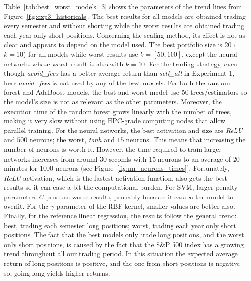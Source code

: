 Table~\ref{tab:best_worst_models_3} shows the parameters of the trend lines from Figure~\ref{fig:exp3_historicals}. The best results for all models are obtained trading every semester and without shorting while the worst results are obtained trading each year only short positions. Concerning the scaling method, its effect is not as clear and appears to depend on the model used. The best portfolio size is 20 ($k=10$) for all models while worst results use $k=[50, 100]$, except the neural networks whose worst result is also with $k=10$. For the trading strategy, even though \textit{avoid\_fees} has a better average return than \textit{sell\_all} in Experiment 1, here \textit{avoid\_fees} is not used by any of the best models.
For both the random forest and AdaBoost models, the best and worst model use 50 trees/estimators so the model's size is not as relevant as the other parameters. Moreover, the execution time of the random forest grows linearly with the number of trees, making it very slow without using HPC-grade computing nodes that allow parallel training.
For the neural networks, the best activation and size are \textit{ReLU} and $500$ neurons; the worst, \textit{tanh} and $15$ neurons. This means that increasing the number of neurons is worth it. However, the time required to train larger networks increases from  around 30 seconds with 15 neurons to an average of 20 minutes for 1000 neurons (see Figure~\ref{fig:nn_neurons_times}). Fortunately, \textit{ReLU} activation, which is the fastest activation function, also gets the best results so it can ease a bit the computational burden.
For SVM, larger penalty parameters $C$ produce worse results, probably because it causes the model to overfit. For the $\gamma$ parameter of the RBF kernel, smaller values are better also.
Finally, for the reference linear regression, the results follow the general trend: best, trading each semester long positions; worst, trading each year only short positions.
The fact that the best models only trade long positions, and the worst only short positions, is caused by the fact that the S\&P 500 index has a growing trend throughout all our trading period. In this situation the expected average return of long positions is positive, and the one from short positions is negative so, going long yields higher returns.
